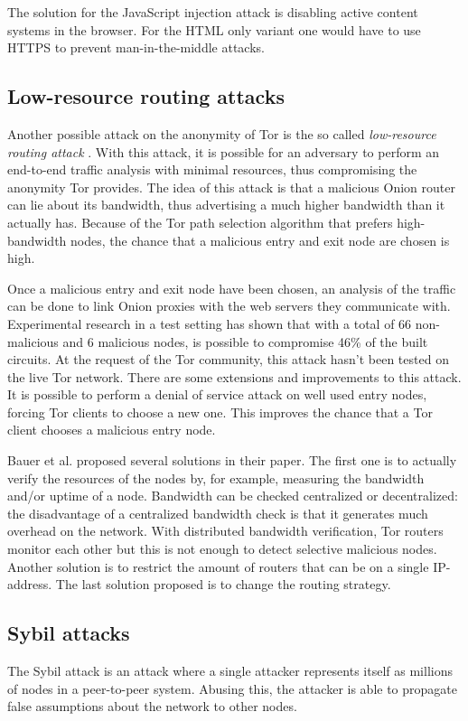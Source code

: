 \documentclass{article}
\begin{document}
		The solution for the JavaScript injection attack is disabling active content systems in the browser. For the HTML only variant one would have to use HTTPS to prevent man-in-the-middle attacks.
		
	\subsection{Low-resource routing attacks}
		Another possible attack on the anonymity of Tor is the so called \emph{low-resource routing attack} \cite{bauer2007low}. With this attack, it is possible for an adversary to perform an end-to-end traffic analysis with minimal resources, thus compromising the anonymity Tor provides. The idea of this attack is that a malicious Onion router can lie about its bandwidth, thus advertising a much higher bandwidth than it actually has. Because of the Tor path selection algorithm that prefers high-bandwidth nodes, the chance that a malicious entry and exit node are chosen is high.

		Once a malicious entry and exit node have been chosen, an analysis of the traffic can be done to link Onion proxies with the web servers they communicate with. Experimental research in a test setting has shown that with a total of 66 non-malicious and 6 malicious nodes, is possible to compromise 46\% of the built circuits. At the request of the Tor community, this attack hasn't been tested on the live Tor network. There are some extensions and improvements to this attack. It is possible to perform a denial of service attack on well used entry nodes, forcing Tor clients to choose a new one. This improves the chance that a Tor client chooses a malicious entry node. 

		Bauer et al. proposed several solutions in their paper. The first one is to actually verify the resources of the nodes by, for example, measuring the bandwidth and/or uptime of a node. Bandwidth can be checked centralized or decentralized: the disadvantage of a centralized bandwidth check is that it generates much overhead on the network. With distributed bandwidth verification, Tor routers monitor each other but this is not enough to detect selective malicious nodes. Another solution is to restrict the amount of routers that can be on a single IP-address. The last solution proposed is to change the routing strategy.	
		
	\subsection{Sybil attacks}
		The Sybil attack is an attack where a single attacker represents itself as millions of nodes in a peer-to-peer system. Abusing this, the attacker is able to propagate false assumptions about the network to other nodes.
		
\end{document}
